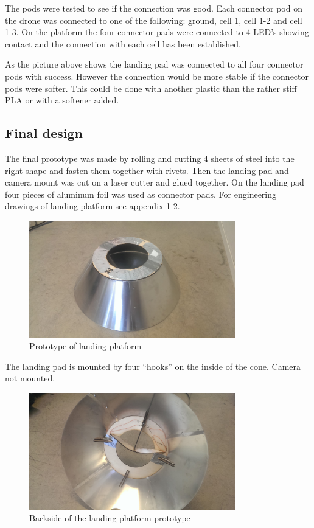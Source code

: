 The pods were tested to see if the connection was good. Each connector pod on the drone was connected to one of the following: ground, cell 1, cell 1-2 and cell 1-3. On the platform the four connector pads were connected to 4 LED's showing contact and the connection with each cell has been established.

As the picture above shows the landing pad was connected to all four connector pods with success. However the connection would be more stable if the connector pods were softer. This could be done with another plastic than the rather stiff PLA or with a softener added.
\subsection{Final design}
The final prototype was made by rolling and cutting 4 sheets of steel into the right shape and fasten them together with rivets. Then the landing pad and camera mount was cut on a laser cutter and glued together. On the landing pad four pieces of aluminum foil was used as connector pads. For engineering drawings of landing platform see appendix 1-2.

\begin{figure}
	\centering
	\includegraphics[width=0.8\textwidth]{imgs/cone_naked}
	\caption{Prototype of landing platform}
\end{figure}

The landing pad is mounted by four “hooks” on the inside of the cone. Camera not mounted.

\begin{figure}
	\centering
	\includegraphics[width=0.8\textwidth]{imgs/cone_inside}
	\caption{Backside of the landing platform prototype}
\end{figure}

